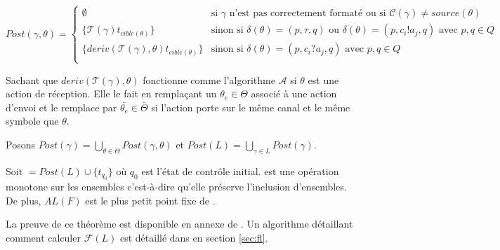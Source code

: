 $$
Post(\gamma,\theta) = \left\{ \begin{array}{ll}
    \emptyset & \text{si } \gamma \text{ n'est pas correctement formaté ou si } \mathcal{C}(\gamma)\neq source(\theta)\\
    \{\mathcal{T}(\gamma)t_{cible(\theta)}\} & \text{sinon si }\delta(\theta)=(p,\tau,q) \text{ ou } \delta(\theta)=(p,c_i!a_j,q) \text{ avec }p,q\in Q\\
    \{deriv(\mathcal{T}(\gamma),\theta)t_{cible(\theta)}\}& \text{sinon si } \delta(\theta)=(p,c_i?a_j,q) \text{ avec }p,q\in Q \\
    \end{array} \right.
$$

Sachant que $deriv(\mathcal{T}(\gamma),\theta)$ fonctionne comme l'algorithme $\mathcal{A}$ si $\theta$ est une action de réception. Elle le fait en remplaçant un $\theta_e \in \Theta$ associé à une action d'envoi et le remplace par $\bar{\theta_e} \in \bar{\Theta}$ si l'action porte sur le même canal et le même symbole que $\theta$.

Posons $Post(\gamma)=\bigcup_{\theta\in\Theta}Post(\gamma,\theta)$ et $Post(L)=\bigcup_{\gamma\in L}Post(\gamma)$.


\begin{theorem}\label{thm:fl}
  Soit \fl$=Post(L)\cup\{t_{q_0}\}$ où $q_0$ est l'état de contrôle initial. \fl est une opération monotone sur les ensembles c'est-à-dire qu'elle préserve l'inclusion d'ensembles. De plus, $AL(F)$ est le plus petit point fixe de \fl.
\end{theorem}

La preuve de ce théorème est disponible en annexe de \cite{Vardhan04}. Un algorithme détaillant comment calculer $\mathcal{F}(L)$ est détaillé dans en section \ref{sec:fl}.
